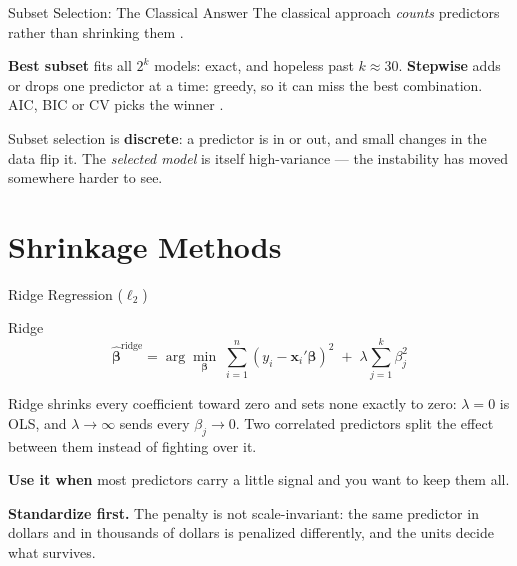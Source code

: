 \documentclass[aspectratio=169, 11pt]{beamer}
\begin{document}
\begin{frame}{Subset Selection: The Classical Answer}
  The classical approach \emph{counts} predictors rather than shrinking them
  \parencite{Guyon2003}.

  \vspace{0.15cm}
  \textbf{Best subset} fits all $2^k$ models: exact, and hopeless past $k \approx 30$.
  \textbf{Stepwise} adds or drops one predictor at a time: greedy, so it can miss the best
  combination. AIC, BIC or CV picks the winner \parencite[\S7.5]{Hyndman2021}.
  \begin{warningbox}
    Subset selection is \textbf{discrete}: a predictor is in or out, and small changes in the
    data flip it. The \emph{selected model} is itself high-variance --- the instability has
    moved somewhere harder to see.
  \end{warningbox}

  \vspace{0.1cm}
\end{frame}

\section{Shrinkage Methods}


\begin{frame}{Ridge Regression ($\ell_2$)}
  \begin{definitionbox}{Ridge \parencite{HoerlKennard1970}}
    \[
      \hat{\boldsymbol{\beta}}^{\text{ridge}}
      = \arg\min_{\boldsymbol{\beta}} \;
        \sum_{i=1}^{n}(y_i - \mathbf{x}_i'\boldsymbol{\beta})^2
        \; + \; \lambda \sum_{j=1}^{k} \beta_j^2
    \]
  \end{definitionbox}
  Ridge shrinks every coefficient toward zero and sets none exactly to zero: $\lambda = 0$ is
  OLS, and $\lambda \to \infty$ sends every $\beta_j \to 0$. Two correlated predictors split the
  effect between them instead of fighting over it.

  \vspace{0.15cm}
  \textbf{Use it when} most predictors carry a little signal and you want to keep them all.

  \vspace{0.15cm}
  \textbf{Standardize first.} The penalty is not scale-invariant: the same predictor in dollars
  and in thousands of dollars is penalized differently, and the units decide what survives.
\end{frame}
\end{document}
